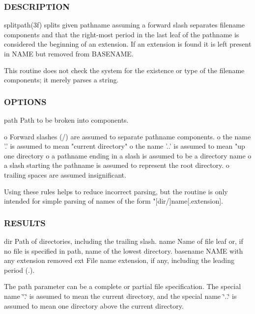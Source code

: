 \subsubsection*{D\+E\+S\+C\+R\+I\+P\+T\+I\+ON}

splitpath(3f) splits given pathname assuming a forward slash separates filename components and that the right-\/most period in the last leaf of the pathname is considered the beginning of an extension. If an extension is found it is left present in N\+A\+ME but removed from B\+A\+S\+E\+N\+A\+ME.

This routine does not check the system for the existence or type of the filename components; it merely parses a string.

\subsubsection*{O\+P\+T\+I\+O\+NS}

path Path to be broken into components. \begin{DoxyVerb}      o Forward slashes (/) are assumed to separate pathname components.
      o the name '.' is assumed to mean "current directory"
      o the name '..' is assumed to mean "up one directory
      o a pathname ending in a slash is assumed to be a directory name
      o a slash starting the pathname is assumed to represent the root
        directory.
      o trailing spaces are assumed insignificant.
\end{DoxyVerb}


Using these rules helps to reduce incorrect parsing, but the routine is only intended for simple parsing of names of the form "\mbox{[}dir/\mbox{]}name\mbox{[}.extension\mbox{]}.

\subsubsection*{R\+E\+S\+U\+L\+TS}

dir Path of directories, including the trailing slash. name Name of file leaf or, if no file is specified in path, name of the lowest directory. basename N\+A\+ME with any extension removed ext File name extension, if any, including the leading period (.).

The path parameter can be a complete or partial file specification. The special name \char`\"{}.\char`\"{} is assumed to mean the current directory, and the special name \char`\"{}..\char`\"{} is assumed to mean one directory above the current directory.

